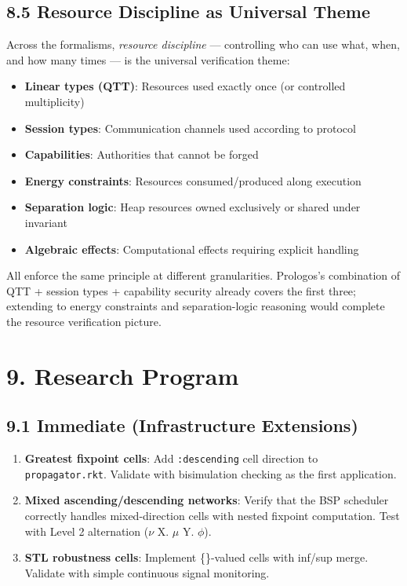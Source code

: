 \documentclass[11pt]{article}
\begin{document}
\subsection{8.5 Resource Discipline as Universal Theme}
\label{sec:org566fd82}

Across the formalisms, \emph{resource discipline} --- controlling who can use what,
when, and how many times --- is the universal verification theme:

\begin{itemize}
\item \textbf{Linear types (QTT)}: Resources used exactly once (or controlled multiplicity)
\item \textbf{Session types}: Communication channels used according to protocol
\item \textbf{Capabilities}: Authorities that cannot be forged
\item \textbf{Energy constraints}: Resources consumed/produced along execution
\item \textbf{Separation logic}: Heap resources owned exclusively or shared under invariant
\item \textbf{Algebraic effects}: Computational effects requiring explicit handling
\end{itemize}

All enforce the same principle at different granularities. Prologos's
combination of QTT + session types + capability security already covers the
first three; extending to energy constraints and separation-logic reasoning
would complete the resource verification picture.
\section{9. Research Program}
\label{sec:org0b52054}

\subsection{9.1 Immediate (Infrastructure Extensions)}
\label{sec:orgdd41f6b}

\begin{enumerate}
\item \textbf{Greatest fixpoint cells}: Add \texttt{:descending} cell direction to
\texttt{propagator.rkt}. Validate with bisimulation checking as the first
application.

\item \textbf{Mixed ascending/descending networks}: Verify that the BSP scheduler
correctly handles mixed-direction cells with nested fixpoint computation.
Test with Level 2 alternation (\(\nu\) X. \(\mu\) Y. \(\phi\)).

\item \textbf{STL robustness cells}: Implement
\overline\{\}-valued cells with inf/sup merge. Validate with
simple continuous signal monitoring.
\end{enumerate}
\end{document}
